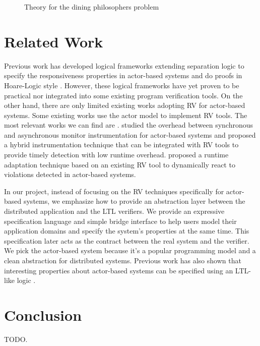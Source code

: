 \documentclass[format=acmsmall, nonacm=true, review=true, screen=true]{acmart}
\newcommand{\mycaption}[1]{\Description{#1}\caption{#1}}
\begin{document}
\begin{figure}[ht]
  {
    \fontsize{10}{12}\selectfont
    
  }
  \mycaption{Theory for the dining philosophers problem}
  \label{fig:phil-theory}
\end{figure}

\section{Related Work}

Previous work has developed logical frameworks extending separation logic to specify the responsiveness properties in actor-based systems and do proofs in Hoare-Logic style \cite{actorservice, parthasarathy2018modular}.
However, these logical frameworks have yet proven to be practical nor integrated into some existing program verification tools.
On the other hand, there are only limited existing works adopting RV for actor-based systems.
Some existing works \cite{shafiei2020actor,lavery2017actor} use the actor model to implement RV tools.
The most relevant works we can find are \cite{cassar2015synchronous,cassar2015runtime}.
\cite{cassar2015synchronous} studied the overhead between synchronous and asynchronous monitor instrumentation for actor-based systems and proposed a hybrid instrumentation technique that can be  integrated with RV tools to provide timely detection with low runtime overhead.
\cite{cassar2015runtime} proposed a runtime adaptation technique based on an existing RV tool to dynamically react to violations detected in actor-based systems.

In our project, instead of focusing on the RV techniques specifically for actor-based systems, we emphasize how to provide an abstraction layer between the distributed application and the LTL verifiers.
We provide an expressive specification language and simple bridge interface to help users model their application domains and specify the system's properties at the same time. This specification later acts as the contract between the real system and the verifier.
We pick the actor-based system because it's a popular programming model and a clean abstraction for distributed systems.
Previous work has also shown that interesting properties about actor-based systems can be specified using an LTL-like logic \cite{actorservice, parthasarathy2018modular}.

\section{Conclusion}

TODO.

\pagebreak



\end{document}
